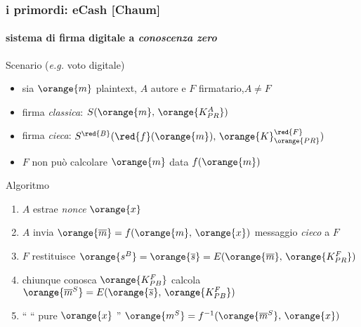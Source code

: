 \begin{frame}
	\frametitle{i primordi: eCash [Chaum]}
	\framesubtitle{sistema di firma digitale a \textit{conoscenza zero}}
	
	Scenario (\textit{e.g.} voto digitale)
	\begin{itemize}
	  \item sia $\orange{m}$ plaintext, $A$ autore e $F$ firmatario,\;\;$A\neq F$
	  \item firma \textit{classica}: $S(\orange{m},\,\orange{K_{PR}^A})$
	  \item firma \textit{{\color{blue}cieca}}: $S^\red{B}(\red{f}(\orange{m}),\,\orange{K}_{\orange{PR}}^\red{F})$
	  \item $F$ non può calcolare $\orange{m}$ data $f(\orange{m})$  
	\end{itemize}
	
	Algoritmo
	\begin{enumerate}
	  \item $A$ estrae \textit{nonce} $\orange{x}$
	  \item $A$ invia $\orange{\overline{m}}=f(\orange{m},\,\orange{x})$ messaggio \textit{cieco} a $F$
	  \item $F$ restituisce $\orange{s^B}=\orange{\overline{s}}=E(\orange{\overline{m}},\,\orange{K_{PR}^F})$ 
	  \item chiunque conosca $\orange{K_{PB}^F}$ calcola $\orange{\overline{m}^S}=E(\orange{\overline{s}},\,\orange{K_{PB}^F})$
	  \item \hspace{1pt}\;\;\;\;\;\;``\;\;\;\;\;\;\;\;\;\;\;\;\; ``\;\;\;\;\;\; pure $\orange{x}$ \;\;\;\;''\;\; $\orange{m^S}=f^{-1}(\orange{\overline{m}^S},\,\orange{x})$
	\end{enumerate}

\end{frame}